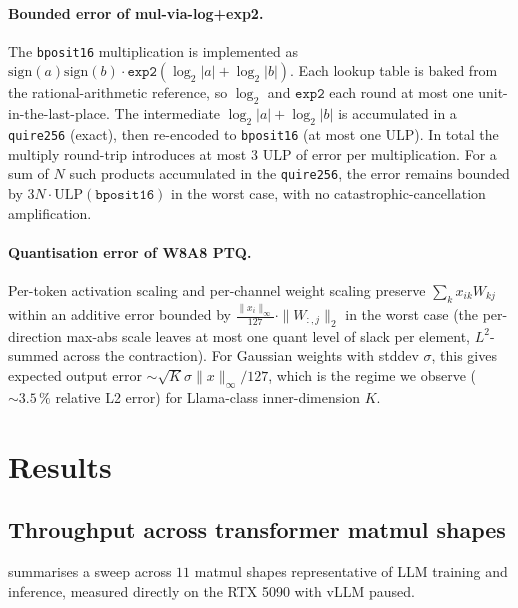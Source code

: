 \documentclass[11pt,a4paper]{article}
\newcommand{\bpsixteen}{\texttt{bposit16}}
\newcommand{\quireTSF}{\texttt{quire256}}
\begin{document}
\paragraph{Bounded error of mul-via-log+exp2.} The \bpsixteen{}
multiplication is implemented as
$\mathrm{sign}(a) \mathrm{sign}(b) \cdot \texttt{exp2}(\log_2|a| +
\log_2|b|)$. Each lookup table is baked from the rational-arithmetic
reference, so $\log_2$ and $\texttt{exp2}$ each round at most one
unit-in-the-last-place. The intermediate $\log_2|a| + \log_2|b|$ is
accumulated in a \quireTSF{} (exact), then re-encoded to \bpsixteen{}
(at most one ULP). In total the multiply round-trip introduces at most
$3$ ULP of error per multiplication. For a sum of $N$ such products
accumulated in the \quireTSF{}, the error remains bounded by
$3N \cdot \mathrm{ULP}(\bpsixteen{})$ in the worst case, with no
catastrophic-cancellation amplification.

\paragraph{Quantisation error of W8A8 PTQ.} Per-token activation
scaling and per-channel weight scaling preserve $\sum_k x_{ik} W_{kj}$
within an additive error bounded by
$\frac{\|x_i\|_\infty}{127} \cdot \|W_{:,j}\|_2$ in the worst case
(the per-direction max-abs scale leaves at most one quant level of
slack per element, $L^2$-summed across the contraction). For Gaussian
weights with stddev $\sigma$, this gives expected output error
$\sim \sqrt{K} \sigma \|x\|_\infty / 127$, which is the regime we
observe ($\sim 3.5\,\%$ relative L2 error) for Llama-class
inner-dimension $K$.

\section{Results}
\label{sec:results}

\subsection{Throughput across transformer matmul shapes}

 summarises a sweep across $11$ matmul shapes
representative of LLM training and inference, measured directly on the
RTX 5090 with vLLM paused.
\end{document}
